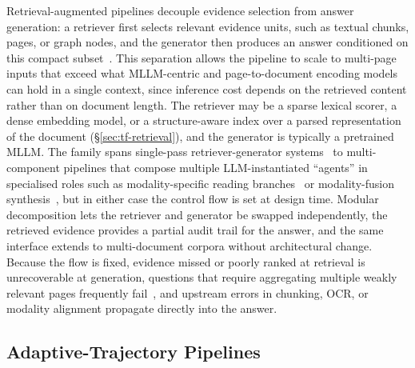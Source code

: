 \documentclass[11pt]{article}
\begin{document}
Retrieval-augmented pipelines decouple evidence selection from answer generation: a retriever first selects relevant evidence units, such as textual chunks, pages, or graph nodes, and the generator then produces an answer conditioned on this compact subset~\cite{cho2024m3docrag,tanaka2025vdocrag}. This separation allows the pipeline to scale to multi-page inputs that exceed what MLLM-centric and page-to-document encoding models can hold in a single context, since inference cost depends on the retrieved content rather than on document length. The retriever may be a sparse lexical scorer, a dense embedding model, or a structure-aware index over a parsed representation of the document (\S\ref{sec:tf-retrieval}), and the generator is typically a pretrained MLLM. The family spans single-pass retriever-generator systems~\cite{cho2024m3docrag} to multi-component pipelines that compose multiple LLM-instantiated ``agents'' in specialised roles such as modality-specific reading branches~\cite{han2025mdocagent} or modality-fusion synthesis~\cite{duan2025m2rag}, but in either case the control flow is set at design time. Modular decomposition lets the retriever and generator be swapped independently, the retrieved evidence provides a partial audit trail for the answer, and the same interface extends to multi-document corpora without architectural change. Because the flow is fixed, evidence missed or poorly ranked at retrieval is unrecoverable at generation, questions that require aggregating multiple weakly relevant pages frequently fail~\cite{wu2025molorag}, and upstream errors in chunking, OCR, or modality alignment propagate directly into the answer.

\subsection{Adaptive-Trajectory Pipelines} 
\label{sec:arch-agent}
\end{document}
